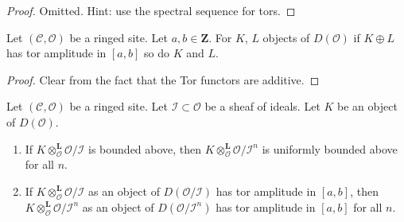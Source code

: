 \begin{proof}
Omitted. Hint: use the spectral sequence for tors.
\end{proof}

\begin{lemma}
\label{lemma-summands-tor-amplitude}
Let $(\mathcal{C}, \mathcal{O})$ be a ringed site. Let $a, b \in \mathbf{Z}$.
For $K$, $L$ objects of $D(\mathcal{O})$ if $K \oplus L$ has tor
amplitude in $[a, b]$ so do $K$ and $L$.
\end{lemma}

\begin{proof}
Clear from the fact that the Tor functors are additive.
\end{proof}

\begin{lemma}
\label{lemma-bounded}
Let $(\mathcal{C}, \mathcal{O})$ be a ringed site.
Let $\mathcal{I} \subset \mathcal{O}$ be a sheaf of ideals.
Let $K$ be an object of $D(\mathcal{O})$.
\begin{enumerate}
\item If $K \otimes_\mathcal{O}^\mathbf{L} \mathcal{O}/\mathcal{I}$
is bounded above, then
$K \otimes_\mathcal{O}^\mathbf{L} \mathcal{O}/\mathcal{I}^n$
is uniformly bounded above for all $n$.
\item If $K \otimes_\mathcal{O}^\mathbf{L} \mathcal{O}/\mathcal{I}$
as an object of $D(\mathcal{O}/\mathcal{I})$ has tor amplitude in $[a, b]$,
then $K \otimes_\mathcal{O}^\mathbf{L} \mathcal{O}/\mathcal{I}^n$
as an object of $D(\mathcal{O}/\mathcal{I}^n)$
has tor amplitude in $[a, b]$ for all $n$.
\end{enumerate}
\end{lemma}

